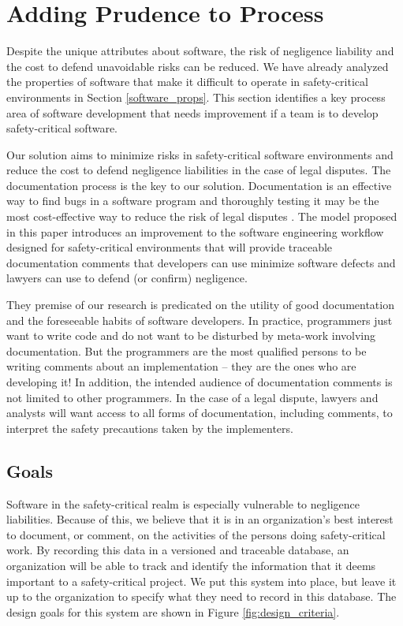 \section{Adding Prudence to Process}\label{solution}
Despite the unique attributes about software, the risk of negligence liability
and the cost to defend unavoidable risks can be reduced. We have already
analyzed the properties of software that make it difficult to operate in
safety-critical environments in Section \ref{software_props}. This section
identifies a key process area of software development that needs improvement if
a team is to develop safety-critical software.

Our solution aims to minimize risks in safety-critical software environments and
reduce the cost to defend negligence liabilities in the case of legal disputes.
The documentation process is the key to our solution. Documentation is an
effective way to find bugs in a software program and thoroughly testing it may
be the most cost-effective way to reduce the risk of legal disputes
\cite{Kaner_doc_1995}. The model proposed in this paper introduces an
improvement to the software engineering workflow designed for safety-critical
environments that will provide traceable documentation comments that developers
can use minimize software defects and lawyers can use to defend (or confirm)
negligence.

They premise of our research is predicated on the utility of good documentation
and the foreseeable habits of software developers. In practice, programmers just
want to write code and do not want to be disturbed by meta-work involving
documentation. But the programmers are the most qualified persons to be writing
comments about an implementation -- they are the ones who are developing it! In
addition, the intended audience of documentation comments is not limited to
other programmers. In the case of a legal dispute, lawyers and analysts will
want access to all forms of documentation, including comments, to interpret the
safety precautions taken by the implementers.

\subsection{Goals}\label{goals}
Software in the safety-critical realm is especially vulnerable to negligence
liabilities. Because of this, we believe that it is in an organization's best
interest to document, or comment, on the activities of the persons doing
safety-critical work. By recording this data in a versioned and traceable 
database, an organization will be able to track and identify the information
that it deems important to a safety-critical project. We put this system into
place, but leave it up to the organization to specify what they need to record
in this database. The design goals for this system are shown in Figure 
\ref{fig:design_criteria}.

